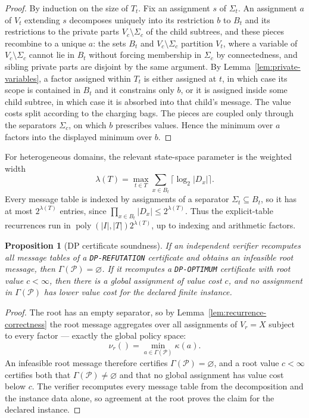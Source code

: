 \documentclass[11pt]{article}
\theoremstyle{plain}
\newtheorem{proposition}[theorem]{Proposition}
\theoremstyle{definition}
\theoremstyle{remark}
\begin{document}
\begin{proof}
By induction on the size of \(T_t\).  Fix an assignment \(s\) of
\(\Sigma_t\).  An assignment \(a\) of \(V_t\) extending \(s\) decomposes
uniquely into its restriction \(b\) to \(B_t\) and its restrictions to the
private parts \(V_c\setminus\Sigma_c\) of the child subtrees, and these
pieces recombine to a unique \(a\): the sets \(B_t\) and
\(V_c\setminus\Sigma_c\) partition \(V_t\), where a variable of
\(V_c\setminus\Sigma_c\) cannot lie in \(B_t\) without forcing membership
in \(\Sigma_c\) by connectedness, and sibling private parts are disjoint by
the same argument.  By Lemma~\ref{lem:private-variables}, a factor assigned
within \(T_t\) is either assigned at \(t\), in which case its scope is
contained in \(B_t\) and it constrains only \(b\), or it is assigned inside
some child subtree, in which case it is absorbed into that child's message.
The value costs split according to the charging bags.  The pieces are coupled
only through the separators \(\Sigma_c\), on which \(b\) prescribes values.
Hence the minimum over \(a\) factors into the displayed minimum over \(b\).
\end{proof}

For heterogeneous domains, the relevant state-space parameter is the weighted
width
\[
  \lambda(T)=\max_{t\in T}\sum_{x\in B_t}\lceil\log_2|D_x|\rceil.
\]
Every message table is indexed by assignments of a separator
\(\Sigma_t\subseteq B_t\), so it has at most \(2^{\lambda(T)}\) entries,
since \(\prod_{x\in B_t}|D_x|\le 2^{\lambda(T)}\).  Thus the
explicit-table recurrences run in
\(\operatorname{poly}(|I|,|T|)2^{\lambda(T)}\), up to indexing and
arithmetic factors.

\begin{proposition}[DP certificate soundness]
\label{prop:dp-soundness}
If an independent verifier recomputes all message tables of a
\texttt{DP-REFUTATION} certificate and obtains an infeasible root message,
then \(\Gamma(\mathcal P)=\varnothing\).  If it recomputes a \texttt{DP-OPTIMUM}
certificate with root value \(c<\infty\), then there is a global assignment
of value cost \(c\), and no assignment in \(\Gamma(\mathcal P)\) has lower value
cost for the declared finite instance.
\end{proposition}

\begin{proof}
The root has an empty separator, so by
Lemma~\ref{lem:recurrence-correctness} the root message aggregates over all
assignments of \(V_r=X\) subject to every factor --- exactly the global
policy space:
\[
  \nu_r()=\min_{a\in\Gamma(\mathcal P)}\kappa(a).
\]
An infeasible root message therefore certifies \(\Gamma(\mathcal
P)=\varnothing\), and a root value \(c<\infty\) certifies both that
\(\Gamma(\mathcal P)\ne\varnothing\) and that no global assignment has value
cost below \(c\).  The verifier recomputes every message table from the
decomposition and the instance data alone, so agreement at the root proves the
claim for the declared instance.
\end{proof}
\end{document}

